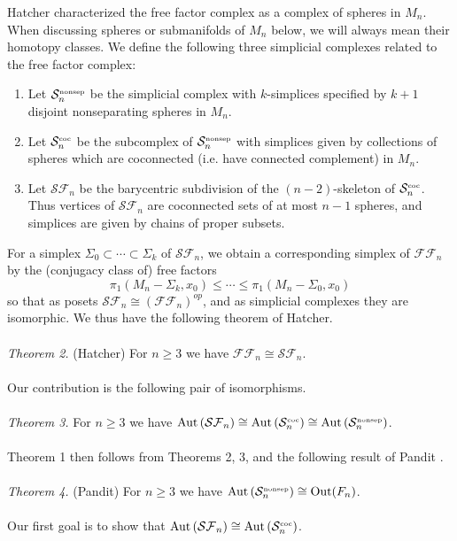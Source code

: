 \documentclass[11pt]{article}
\newcommand{\Aut}[1]{\ensuremath{ \aaut \left (#1 \right ) }}
\newcommand{\outn}{{\ensuremath{ \oout(F_n)}} }
\newcommand{\nosep}{{\ensuremath{ \mathcal S^{\mbox{\tiny{nonsep}}}_n }}}
\newcommand{\coc}[1]{{\ensuremath{ \mathcal S^{\mbox{\tiny{coc}}}_{#1} }}}
\newcommand{\ffn}{{\ensuremath{ \mathcal {FF}_n }}}
\newcommand{\sfn}{{\ensuremath{ \mathcal {SF}_n }}}
\DeclareMathOperator{\oout}{Out}
\DeclareMathOperator{\aaut}{Aut}
\begin{document}
Hatcher \cite{MR1660045} characterized the free factor complex as a complex of spheres in $M_n$.
When discussing spheres or submanifolds of $M_n$ below, we will always mean their homotopy classes.
We define the following three simplicial complexes related to the free factor complex:
\begin{enumerate}[$\cdot$]
\item
Let $\nosep$ be the simplicial complex with $k$-simplices specified by $k+1$ disjoint nonseparating spheres in $M_n$.
\item
Let $\coc n$ be the subcomplex of $\nosep$ with simplices given by collections of spheres which are coconnected (i.e. have connected complement) in $M_n$.
\item
Let $\sfn$ be the barycentric subdivision of the $(n-2)$-skeleton of $\coc n$. Thus vertices of $\sfn$ are coconnected sets of at most $n-1$ spheres, and simplices are given by chains of proper subsets.
\end{enumerate}
For a simplex $\Sigma_0 \subset \cdots \subset \Sigma_k$ of $\sfn$, we obtain a corresponding 
simplex of $\ffn$ by the (conjugacy class of) free factors $$\pi_1(M_n-\Sigma_k,x_0) \leqslant \cdots \leqslant \pi_1(M_n-\Sigma_0,x_0)$$ so that as posets $\sfn \cong (\ffn)^{op}$, and as simplicial complexes they are isomorphic. We thus have the following theorem of Hatcher.\\
\\
\emph{Theorem 2.} (Hatcher) For $n \geq 3$ we have $\ffn \cong \sfn$.\\
\\
Our contribution is the following pair of isomorphisms.\\
\\
\noindent \emph{Theorem 3.} For $n \geq 3$ we have
$\Aut{\sfn} \cong \Aut{\coc n} \cong \Aut{\nosep}$.\\
\\
Theorem 1 then follows from Theorems 2, 3, and the following result of Pandit \cite{pandit}.\\
\\
\emph{Theorem 4.} (Pandit) For $n \geq 3$ we have $\Aut{\nosep} \cong \outn$.\\
\\
Our first goal is to show that $\Aut{\sfn} \cong \Aut{\coc n}$.
\end{document}
